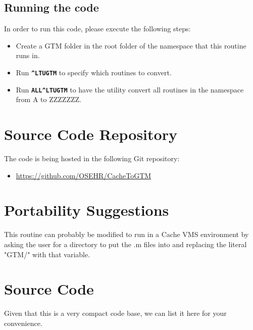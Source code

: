 \documentclass{OSEHRAArticle}
\newcommand{\lstlistingwithnumber}[3]{
\begin{center}

\end{center}
}
\begin{document}
\subsection{Running the code}

In order to run this code, please execute the following steps:

\begin{itemize}
\item Create a GTM folder in the root folder of the namespace that this routine runs in.
\item Run \textbf{\texttt{\^{}LTUGTM}} to specify which routines to convert.
\item Run \textbf{\texttt{ALL\^{}LTUGTM}} to have the utility convert all routines in the namespace from A to ZZZZZZZ.
\end{itemize}


\section{Source Code Repository}

The code is being hosted in the following Git repository:

\begin{itemize}
\item \url{https://github.com/OSEHR/CacheToGTM}
\end{itemize}


\section{Portability Suggestions}

This routine can probably be modified to run in a Cache VMS environment by
asking the user for a directory to put the .m files into and replacing the
literal "GTM/" with that variable.


\section{Source Code}

Given that this is a very compact code base, we can list it here for your convenience.

\lstlistingwithnumber{1}{49}{LTUGTM.RO}



%
%



\end{document}
